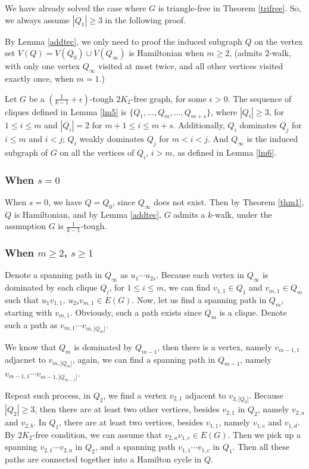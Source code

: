 \documentclass{amsart}
\theoremstyle{definition}
\begin{document}
We have already solved the case where $G$ is triangle-free in Theorem \ref{trifree}. So, we always assume $|Q_1|\ge3$ in the following proof.

By Lemma \ref{addtec}, we only need to proof the induced subgraph $Q$ on the vertex set $V(Q)=V(Q_0)\cup V(Q_{\infty})$ is Hamiltonian when $m\ge2$, (admits 2-walk, with only one vertex $Q_{\infty}$ visited at most twice, and all other vertices visited exactly once, when $m=1$.)

Let $G$ be a $(\frac{1}{k-1}+\epsilon)$-tough $2K_2$-free graph, for some $\epsilon>0$. The sequence of cliques defined in Lemma \ref{lm5} is $\{Q_1,\ldots,Q_m,\ldots,Q_{m+s}\}$, where $|Q_i|\ge3$, for $1\le i\le m$ and $|Q_i|=2$ for $m+1\le i\le m+s$. Additionally, $Q_i$ dominates $Q_j$ for $i\le m$ and $i<j$; $Q_i$ weakly dominates $Q_j$ for $m<i<j$. And $Q_{\infty}$ is the induced subgraph of $G$ on all the vertices of $Q_i$, $i>m$, as defined in Lemma \ref{lm6}. 

\subsubsection{When $s=0$}
When $s=0$, we have $Q=Q_0$, since $Q_{\infty}$ does not exist. Then by Theorem \ref{thm1}, $Q$ is Hamiltonian, and by Lemma \ref{addtec}, $G$ admits a $k$-walk, under the assmuption $G$ is $\frac{1}{k-1}$-tough.
 

\subsubsection{When $m\ge2$, $s\ge1$}
Denote a spanning path in $Q_{\infty}$ as $u_1\cdots u_{2s}$. Because each vertex in $Q_{\infty}$ is dominated by each clique $Q_i$, for $1\le i\le m$, we can find $v_{1,1}\in Q_1$ and $v_{m,1}\in Q_m$ such that $u_1v_{1,1},~u_{2s}v_{m,1}\in E(G)$. Now, let us find a spanning path in $Q_m$, starting with $v_{m,1}$. Obviously, such a path exists since $Q_m$ is a clique. Denote such a path as $v_{m,1}\cdots v_{m,|Q_m|}$. 

We know that $Q_m$ is dominated by $Q_{m-1}$, then there is a vertex, namely $v_{m-1,1}$ adjacnet to $v_{m,|Q_m|}$, again, we can find a spanning path in $Q_{m-1}$, namely $v_{m-1,1}\cdots v_{m-1,|Q_{m-1}|}$. 

Repeat such process, in $Q_2$, we find a vertex $v_{2,1}$ adjacent to $v_{3,|Q_3|}$. Because $|Q_2|\ge3$, then there are at least two other vertices, besides $v_{2,1}$ in $Q_2$, namely $v_{2,a}$ and $v_{2,b}$. In $Q_1$, there are at least two vertices, besides $v_{1,1}$, namely $v_{1,c}$ and $v_{1,d}$. By $2K_2$-free condition, we can assume that $v_{2,a}v_{1,c}\in E(G)$. Then we pick up a spanning $v_{2,1}\cdots v_{2,a}$ in $Q_2$, and a spanning path $v_{1,1}\cdots v_{1,c}$ in $Q_1$. Then all these paths are connected together into a Hamilton cycle in $Q$.
\end{document}
